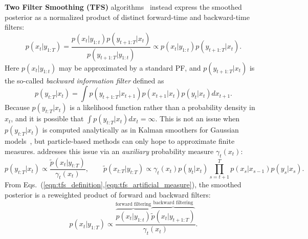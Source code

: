     \textbf{Two Filter Smoothing (TFS)} algorithms~\cite{bresler1986TwoFilter, doucet2009tutorial, Klaas2006FastPS} instead express the smoothed posterior as a normalized product of distinct forward-time and backward-time filters:
        \begin{equation}
            p(x_t|y_{1:T}) = \frac{p(x_t|y_{1:t}) p(y_{t+1:T}|x_t)}{p(y_{t+1:T} | y_{1:t})} \propto p(x_t|y_{1:t}) p(y_{t+1:T}|x_t).
            \label{eqn:tfs_definition}
        \end{equation}
        Here $p(x_t|y_{1:t})$ may be approximated by a standard PF, and $p(y_{t+1:T}|x_t)$ is the so-called \emph{backward information filter} \cite{Klaas2006FastPS, doucet2009tutorial} defined as
        \begin{equation}
            p(y_{t:T} | x_t) = \int p(y_{t+1:T} | x_{t+1}) p(x_{t+1}|x_t) p(y_t|x_t)dx_{t+1}.
        \end{equation}
        Because $p(y_{t:T} | x_t)$ is a likelihood function rather than a probability density in $x_t$, and it is possible that  $\int p(y_{t:T} | x_t) dx_t= \infty$. This is not an issue when $p(y_{t:T} | x_t)$ is computed analytically as in Kalman smoothers for Gaussian models~\cite{anderson1979optimal}, but particle-based methods can only hope to approximate finite measures. 
        \citet{bresler1986TwoFilter} addresses this issue via an \emph{auxiliary} probability measure $\gamma_t({x_t})$:
         \begin{equation}
            p(y_{t:T} | x_t) \propto \frac{\tilde{p}(x_t| y_{t:T})}{\gamma_t(x_t)}, \qquad \tilde{p}(x_{t:T}| y_{t:T}) \propto 
            \gamma_t(x_t) p(y_t|x_t) \prod_{s=t+1}^{T} p(x_{s} | x_{s-1}) p(y_s | x_s).
            \label{eqn:tfs_artificial_measure}
         \end{equation}
         From Eqs.~(\ref{eqn:tfs_definition},\ref{eqn:tfs_artificial_measure}), the smoothed posterior is a reweighted product of forward and backward filters:
        \begin{equation}
            p(x_t|y_{1:T}) \propto \frac{\overbrace{p(x_t|y_{1:t})}^{\text{forward filtering}} \overbrace{\tilde{p}(x_t| y_{t+1:T})}^{\text{backward filtering}}} {\gamma_t(x_t)}.
            \label{eqn:tfs_final_form}
        \end{equation}
